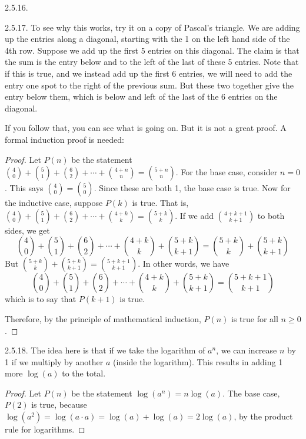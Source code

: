 \begin {itemize}
\begin{ans}{2.5.16.}
\end{ans}
\begin{ans}{2.5.17.}
		To see why this works, try it on a copy of Pascal's triangle.  We are adding up the entries along a diagonal, starting with the 1 on the left hand side of the 4th row.  Suppose we add up the first 5 entries on this diagonal.  The claim is that the sum is the entry below and to the left of the last of these 5 entries.  Note that if this is true, and we instead add up the first 6 entries, we will need to add the entry one spot to the right of the previous sum.  But these two together give the entry below them, which is below and left of the last of the 6 entries on the diagonal.

		If you follow that, you can see what is going on.  But it is not a great proof.  A formal induction proof is needed:

		\begin{proof}
			Let $P(n)$ be the statement ${4 \choose 0} + {5 \choose 1} + {6 \choose 2} + \cdots + {4+n \choose n} = {5+n \choose n}$.  For the base case, consider $n = 0$.  This says ${4 \choose 0} = {5 \choose 0}$.  Since these are both 1, the base case is true.  Now for the inductive case, suppose $P(k)$ is true.  That is, ${4 \choose 0} + {5 \choose 1} + {6 \choose 2} + \cdots + {4+k \choose k} = {5+k \choose k}$.  If we add ${4+k+1 \choose k+1}$ to both sides, we get \[{4 \choose 0} + {5 \choose 1} + {6 \choose 2} + \cdots + {4+k \choose k} + {5+k \choose k+1}= {5+k \choose k} + {5+k \choose k+1}\]
			But ${5+k \choose k} + {5+k \choose k+1} = {5+k+1 \choose k+1}$.  In other words, we have
			\[{4 \choose 0} + {5 \choose 1} + {6 \choose 2} + \cdots + {4+k \choose k} + {5+k \choose k+1} = {5+k+1 \choose k+1}\]
			which is to say that $P(k+1)$ is true.

			Therefore, by the principle of mathematical induction, $P(n)$ is true for all $n \ge 0$.
		\end{proof}
	
\end{ans}
\begin{ans}{2.5.18.}
		The idea here is that if we take the logarithm of $a^n$, we can increase $n$ by 1 if we multiply by another $a$ (inside the logarithm).  This results in adding 1 more $\log(a)$ to the total.

		\begin{proof}
			Let $P(n)$ be the statement $\log(a^n) = n \log(a)$.  The base case, $P(2)$ is true, because $\log(a^2) = \log(a\cdot a) = \log(a) + \log(a) = 2\log(a)$, by the product rule for logarithms.


\end{proof}
\end{ans}
\end{itemize}
